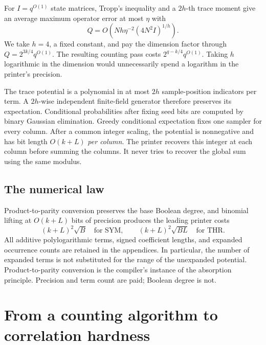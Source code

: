 \documentclass[11pt,letterpaper]{article}
\theoremstyle{definition}
\theoremstyle{remark}
\begin{document}
For $I=q^{O(1)}$ state matrices, Tropp's inequality and a $2h$-th
trace moment give an average maximum operator error at most $\eta$ with
\begin{equation}
Q=O\!\left(Nh\eta^{-2}(4N^2I)^{1/h}\right).
\label{eq:sample-main}
\end{equation}
We take $h=4$, a fixed constant, and pay the dimension factor through
$Q=2^{3k/4}q^{O(1)}$. The resulting counting pass costs
$2^{q-k/4}q^{O(1)}$. Taking $h$ logarithmic in the dimension would
unnecessarily spend a logarithm in the printer's precision.

The trace potential is a polynomial in at most $2h$ sample-position
indicators per term. A $2h$-wise independent finite-field generator
therefore preserves its expectation. Conditional probabilities after
fixing seed bits are computed by binary Gaussian elimination. Greedy
conditional expectation fixes one sampler for every column. After a
common integer scaling, the potential is nonnegative and has bit length
$O(k+L)$ \emph{per column}. The printer recovers this integer at each
column before summing the columns. It never tries to recover the global
sum using the same modulus.

\subsection{The numerical law}
Product-to-parity conversion preserves the base Boolean degree, and
binomial lifting at $O(k+L)$ bits of precision produces the leading
printer costs
\begin{equation}
(k+L)^2\sqrt B\quad\text{for SYM},\qquad
(k+L)^2\sqrt{BL}\quad\text{for THR}.
\label{eq:loads-main}
\end{equation}
All additive polylogarithmic terms, signed coefficient lengths, and
expanded occurrence counts are retained in the appendices. In
particular, the number of expanded terms is not substituted for the
range of the unexpanded potential. Product-to-parity conversion is the
compiler's instance of the absorption principle. Precision and term
count are paid; Boolean degree is not.

\section{From a counting algorithm to correlation hardness}
\label{sec:transfer-overview}
\end{document}
